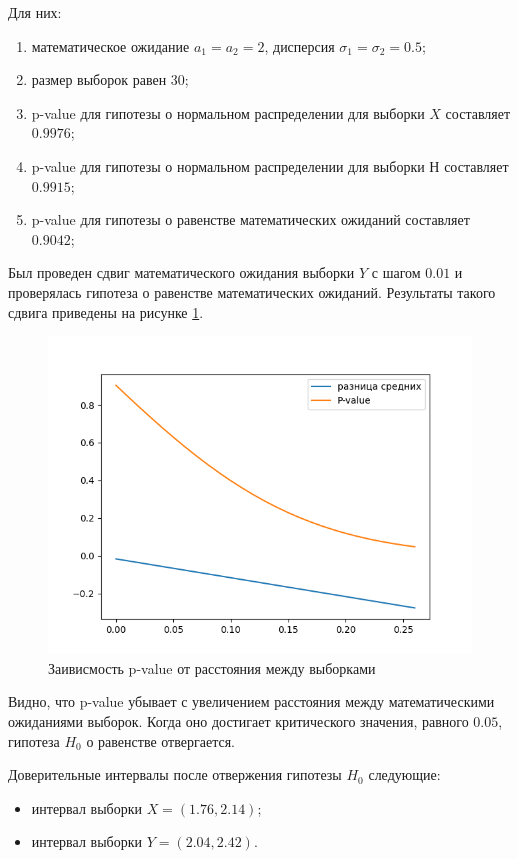 \documentclass[12pt]{report}
\begin{document}
Для них:
\begin{enumerate}
    \item математическое ожидание $a_1 = a_2 = 2$, дисперсия $\sigma_1 = \sigma_2 = 0.5$;
    \item размер выборок равен $30$;
    \item p-value для гипотезы о нормальном распределении для выборки $X$ составляет $0.9976$;
    \item p-value для гипотезы о нормальном распределении для выборки $Н$ составляет $0.9915$;
    \item p-value для гипотезы о равенстве математических ожиданий составляет $0.9042$;
\end{enumerate}

\newpage
Был проведен сдвиг математического ожидания выборки $Y$ с шагом $0.01$ и проверялась гипотеза о равенстве математических ожиданий. Результаты такого сдвига приведены на рисунке \ref{fig:task3}. 

\begin{figure}[h!]
  \centering
  \includegraphics[width = \linewidth]{diffs_3.png}
  \caption{Заивисмость p-value от расстояния между выборками}
  \label{fig:task3}
\end{figure}

Видно, что p-value убывает с увеличением расстояния между математическими ожиданиями выборок. Когда оно достигает критического значения, равного $0.05$, гипотеза $H_0$ о равенстве отвергается.

Доверительные интервалы после отвержения гипотезы $H_0$ следующие:
\begin{itemize}
    \item интервал выборки $X = (1.76, 2.14)$;
    \item интервал выборки $Y = (2.04, 2.42)$.
\end{itemize}
\end{document}
